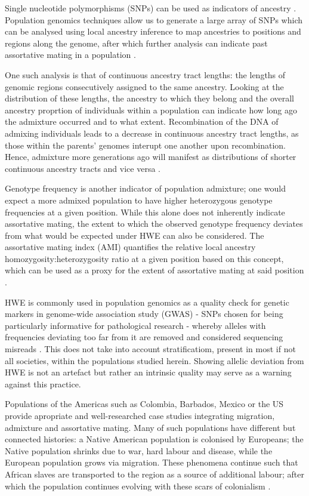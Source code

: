 \documentclass[11pt]{article}
\begin{document}
Single nucleotide polymorphisms (SNPs) can be used as indicators of ancestry \parencite{Risch2009}. Population genomics techniques allow us to generate a large array of SNPs which can be analysed using local ancestry inference to map ancestries to positions and regions along the genome, after which further analysis can indicate past assortative mating in a population \parencite{Schubert2020}.

One such analysis is that of continuous ancestry tract lengths: the lengths of genomic regions consecutively assigned to the same ancestry. Looking at the distribution of these lengths, the ancestry to which they belong and the overall ancestry proprtion of individuals within a population can indicate how long ago the admixture occurred and to what extent. Recombination of the DNA of admixing individuals leads to a decrease in continuous ancestry tract lengths, as those within the parents' genomes interupt one another upon recombination. Hence, admixture more generations ago will manifest as distributions of shorter continuous ancestry tracts and vice versa \parencite{Gravel2012}. 

Genotype frequency is another indicator of population admixture; one would expect a more admixed population to have higher heterozygous genotype frequencies at a given position. While this alone does not inherently indicate assortative mating, the extent to which the observed genotype frequency deviates from what would be expected under HWE can also be considered. The assortative mating index (AMI) quantifies the relative local ancestry homozygosity:heterozygosity ratio at a given position based on this concept, which can be used as a proxy for the extent of assortative mating at said position \parencite{Norris2019}.

HWE is commonly used in population genomics as a quality check for genetic markers in genome-wide association study (GWAS) - SNPs chosen for being particularly informative for pathological research - whereby alleles with frequencies deviating too far from it are removed and considered sequencing misreads \parencite{Linares-Pineda2012}. This does not take into account stratificatiom, present in most if not all societies, within the populations studied herein. Showing allelic deviation from HWE is not an artefact but rather an intrinsic quality may serve as a warning against this practice.

Populations of the Americas such as Colombia, Barbados, Mexico or the US provide apropriate and well-researched case studies integrating migration, admixture and assortative mating. Many of such populations have different but connected histories: a Native American population is colonised by Europeans; the Native population shrinks due to war, hard labour and disease, while the European population grows via migration. These phenomena continue such that African slaves are transported to the region as a source of additional labour; after which the population continues evolving with these scars of colonialism \parencite{Bryc2010,Mas-Sandoval2019,ESilva2020}. 
\end{document}
